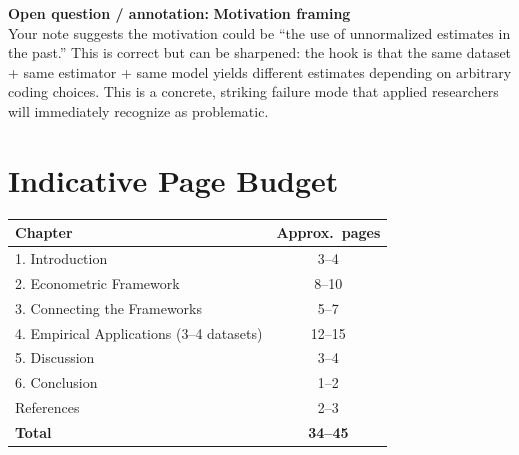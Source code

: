 \documentclass[12pt, a4paper]{article}
\newenvironment{openbox}{%
  \begin{mdframed}[backgroundcolor=greenbg,linecolor=notegreen,linewidth=1pt]%
  \textbf{\color{notegreen}Open question / annotation:} }{%
  \end{mdframed}}
\begin{document}
\begin{openbox}
\textbf{Motivation framing}\\
Your note suggests the motivation could be ``the use of unnormalized estimates in the past.'' This is correct but can be sharpened: the hook is that the same dataset + same estimator + same model yields different estimates depending on arbitrary coding choices. This is a concrete, striking failure mode that applied researchers will immediately recognize as problematic.
\end{openbox}

\section*{Indicative Page Budget}

\begin{center}
\begin{tabular}{lc}
\toprule
Chapter & Approx.\ pages \\
\midrule
1. Introduction & 3--4 \\
2. Econometric Framework & 8--10 \\
3. Connecting the Frameworks & 5--7 \\
4. Empirical Applications (3--4 datasets) & 12--15 \\
5. Discussion & 3--4 \\
6. Conclusion & 1--2 \\
References & 2--3 \\
\midrule
\textbf{Total} & \textbf{34--45} \\
\bottomrule
\end{tabular}
\end{center}
\end{document}
